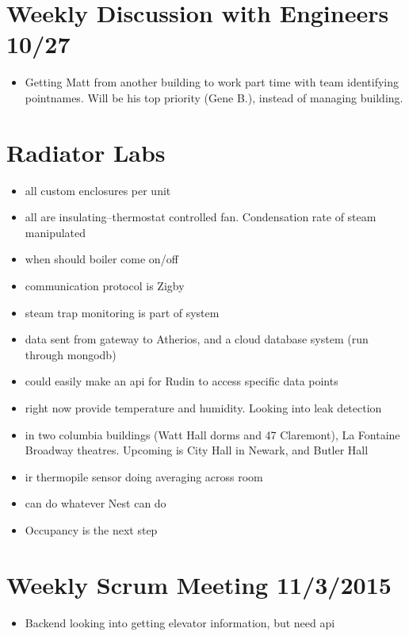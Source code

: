 \documentclass[12pt]{article}
\begin{document}
\section*{Weekly Discussion with Engineers 10/27}
\begin{itemize}
	\item Getting Matt from another building to work part time with team
		identifying pointnames. Will be his top priority (Gene B.), instead of managing
		building.
\end{itemize}
\section*{Radiator Labs}
\begin{itemize}
	\item all custom enclosures per unit
	\item all are insulating--thermostat controlled fan. Condensation rate of
		steam manipulated
	\item when should boiler come on/off
	\item communication protocol is Zigby
	\item steam trap monitoring is part of system
	\item data sent from gateway to Atherios, and a cloud database system (run
		through mongodb)
	\item could easily make an api for Rudin to access specific data points
	\item right now provide temperature and humidity. Looking into leak
		detection
	\item in two columbia buildings (Watt Hall dorms and 47 Claremont), La Fontaine Broadway theatres.
		Upcoming is City Hall in Newark, and Butler Hall
	\item ir thermopile sensor doing averaging across room
	\item can do whatever Nest can do
	\item Occupancy is the next step
\end{itemize}

\section*{Weekly Scrum Meeting 11/3/2015}
\begin{itemize}
	

\item Backend looking into getting elevator information, but need api

\end{itemize}
\end{document}
